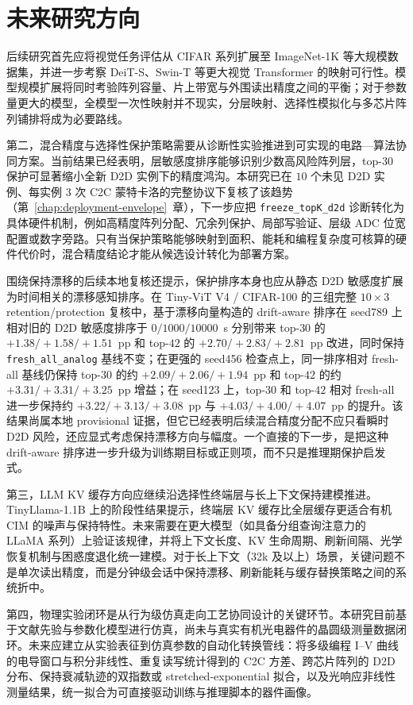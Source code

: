 \section{未来研究方向}

后续研究首先应将视觉任务评估从 CIFAR 系列扩展至 ImageNet-1K 等大规模数据集，并进一步考察 DeiT-S、Swin-T 等更大视觉 Transformer 的映射可行性。模型规模扩展将同时考验阵列容量、片上带宽与外围读出精度之间的平衡；对于参数量更大的模型，全模型一次性映射并不现实，分层映射、选择性模拟化与多芯片阵列铺排将成为必要路线。

第二，混合精度与选择性保护策略需要从诊断性实验推进到可实现的电路—算法协同方案。当前结果已经表明，层敏感度排序能够识别少数高风险阵列层，top-$30$ 保护可显著缩小全新 D2D 实例下的精度鸿沟。本研究已在 $10$ 个未见 D2D 实例、每实例 $3$ 次 C2C 蒙特卡洛的完整协议下复核了该趋势（第~\ref{chap:deployment-envelope}~章），下一步应把 \texttt{freeze\_topK\_d2d} 诊断转化为具体硬件机制，例如高精度阵列分配、冗余列保护、局部写验证、层级 ADC 位宽配置或数字旁路。只有当保护策略能够映射到面积、能耗和编程复杂度可核算的硬件代价时，混合精度结论才能从候选设计转化为部署方案。

围绕保持漂移的后续本地复核还提示，保护排序本身也应从静态 D2D 敏感度扩展为时间相关的漂移感知排序。在 Tiny-ViT V4 / CIFAR-100 的三组完整 $10\times3$ retention/protection 复核中，基于漂移向量构造的 drift-aware 排序在 seed789 上相对旧的 D2D 敏感度排序于 $0/1000/10000$~s 分别带来 top-$30$ 的 $+1.38/+1.58/+1.51$~pp 和 top-$42$ 的 $+2.70/+2.83/+2.81$~pp 改进，同时保持 \texttt{fresh\_all\_analog} 基线不变；在更强的 seed456 检查点上，同一排序相对 fresh-all 基线仍保持 top-$30$ 的约 $+2.09/+2.06/+1.94$~pp 和 top-$42$ 的约 $+3.31/+3.31/+3.25$~pp 增益；在 seed123 上，top-$30$ 和 top-$42$ 相对 fresh-all 进一步保持约 $+3.22/+3.13/+3.08$~pp 与 $+4.03/+4.00/+4.07$~pp 的提升。该结果尚属本地 provisional 证据，但它已经表明后续混合精度分配不应只看瞬时 D2D 风险，还应显式考虑保持漂移方向与幅度。一个直接的下一步，是把这种 drift-aware 排序进一步升级为训练期目标或正则项，而不只是推理期保护启发式。

第三，LLM KV 缓存方向应继续沿选择性终端层与长上下文保持建模推进。TinyLlama-1.1B 上的阶段性结果提示，终端层 KV 缓存比全层缓存更适合有机 CIM 的噪声与保持特性。未来需要在更大模型（如具备分组查询注意力的 LLaMA 系列）上验证该规律，并将上下文长度、KV 生命周期、刷新间隔、光学恢复机制与困惑度退化统一建模。对于长上下文（32k 及以上）场景，关键问题不是单次读出精度，而是分钟级会话中保持漂移、刷新能耗与缓存替换策略之间的系统折中。

第四，物理实验闭环是从行为级仿真走向工艺协同设计的关键环节。本研究目前基于文献先验与参数化模型进行仿真，尚未与真实有机光电器件的晶圆级测量数据闭环。未来应建立从实验表征到仿真参数的自动化转换管线：将多级编程 I--V 曲线的电导窗口与积分非线性、重复读写统计得到的 C2C 方差、跨芯片阵列的 D2D 分布、保持衰减轨迹的双指数或 stretched-exponential 拟合，以及光响应非线性测量结果，统一拟合为可直接驱动训练与推理脚本的器件画像。

